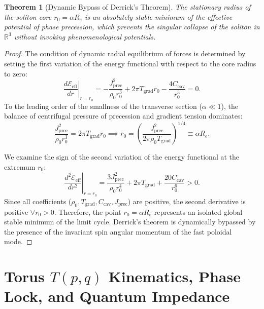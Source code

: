 \documentclass[12pt,a4paper]{article}
\newtheorem{theorem}{Theorem}
\begin{document}
	\begin{theorem}[Dynamic Bypass of Derrick's Theorem]
	The stationary radius of the soliton core $r_0 = \alpha R_e$ is an absolutely stable minimum of the effective potential of phase precession, which prevents the singular collapse of the soliton in $\mathbb{R}^3$ without invoking phenomenological potentials.
	\end{theorem}
	
	\begin{proof}
	The condition of dynamic radial equilibrium of forces is determined by setting the first variation of the energy functional with respect to the core radius to zero:
	\begin{equation}
	\left. \frac{d\mathcal{E}_{\text{eff}}}{dr} \right|_{r=r_0} = -\frac{J_{\text{prec}}^2}{\rho_0 r_0^3} + 2\pi T_{\text{grad}} r_0 - \frac{4 C_{\text{cav}}}{r_0^5} = 0.
	\end{equation}
	To the leading order of the smallness of the transverse section ($\alpha \ll 1$), the balance of centrifugal pressure of precession and gradient tension dominates:
	\begin{equation}
	\frac{J_{\text{prec}}^2}{\rho_0 r_0^3} = 2\pi T_{\text{grad}} r_0 \implies r_0 = \left( \frac{J_{\text{prec}}^2}{2\pi \rho_0 T_{\text{grad}}} \right)^{1/4} \equiv \alpha R_e.
	\end{equation}
		
	We examine the sign of the second variation of the energy functional at the extremum $r_0$:
	\begin{equation}
	\left. \frac{d^2\mathcal{E}_{\text{eff}}}{dr^2} \right|_{r=r_0} = \frac{3 J_{\text{prec}}^2}{\rho_0 r_0^4} + 2\pi T_{\text{grad}} + \frac{20 C_{\text{cav}}}{r_0^6} > 0.
	\end{equation}
	Since all coefficients ($\rho_0, T_{\text{grad}}, C_{\text{cav}}, J_{\text{prec}}$) are positive, the second derivative is positive $\forall r_0 > 0$. Therefore, the point $r_0 = \alpha R_e$ represents an isolated global stable minimum of the limit cycle. Derrick's theorem is dynamically bypassed by the presence of the invariant spin angular momentum of the fast poloidal mode.
	\end{proof}
	
\section{Torus $T(p,q)$ Kinematics, Phase Lock, and Quantum Impedance}
	
\end{document}
